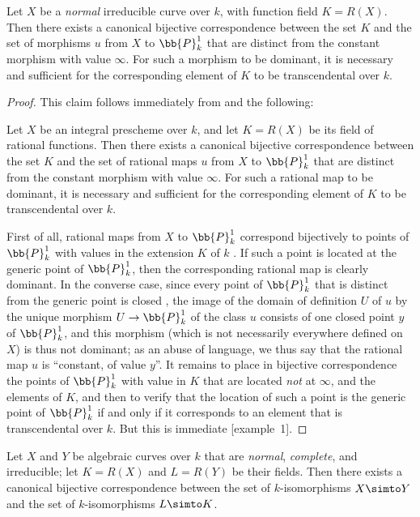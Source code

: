 \begin{corollary}[7.4.15]
\label{II.7.4.15}
Let $X$ be a \emph{normal} irreducible curve over $k$, with function field $K=R(X)$.
Then there exists a canonical bijective correspondence between the set $K$ and the set of morphisms $u$ from $X$ to $\bb{P}_k^1$ that are distinct from the constant morphism with value $\infty$.
For such a morphism to be dominant, it is necessary and sufficient for the corresponding element of $K$ to be transcendental over $k$.
\end{corollary}

\begin{proof}
This claim follows immediately from  and the following:
\begin{lemma}
\label{II.7.4.15.1}
Let $X$ be an integral prescheme over $k$, and let $K=R(X)$ be its field of rational functions.
Then there exists a canonical bijective correspondence between the set $K$ and the set of rational maps $u$ from $X$ to $\bb{P}_k^1$ that are distinct from the constant morphism with value $\infty$.
For such a rational map to be dominant, it is necessary and sufficient for the corresponding element of $K$ to be transcendental over $k$.
\end{lemma}
First of all, rational maps from $X$ to $\bb{P}_k^1$ correspond bijectively to points of $\bb{P}_k^1$ with values in the extension $K$ of $k$ .
If such a point is located  at the generic point of $\bb{P}_k^1$, then the corresponding rational map is clearly dominant.
In the converse case, since every point of $\bb{P}_k^1$ that is distinct from the generic point is closed , the image of the domain of definition $U$ of $u$ by the unique morphism $U\to\bb{P}_k^1$ of the class $u$  consists of one closed point $y$ of $\bb{P}_k^1$, and this morphism (which is not necessarily everywhere defined on $X$) is thus not dominant;
as an abuse of language, we thus say that the rational map $u$ is ``constant, of value $y$''.
It remains to place in bijective correspondence the points of $\bb{P}_k^1$ with value in $K$ that are located  \emph{not} at $\infty$, and the elements of $K$, and then to verify that the location of such a point is the generic point of $\bb{P}_k^1$ if and only if it corresponds to an
element that is transcendental over $k$.
But this is immediate [example~1].
\end{proof}

\begin{corollary}[7.4.16]
\label{II.7.4.16}
Let $X$ and $Y$ be algebraic curves over $k$ that are \emph{normal}, \emph{complete}, and irreducible;
let $K=R(X)$ and $L=R(Y)$ be their fields.
Then there exists a canonical bijective correspondence between the set of $k$-isomorphisms $X\simto Y$ and the set of $k$-isomorphisms $L\simto K$.
\end{corollary}

